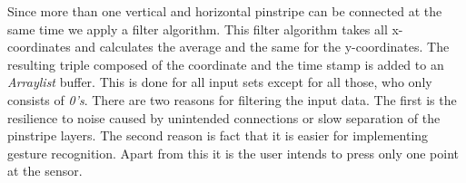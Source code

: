 Since more than one vertical and horizontal pinstripe can be connected at the same time we apply a filter algorithm. This filter algorithm takes all x-coordinates and calculates the average and the same for the y-coordinates. The resulting triple composed of the coordinate and the time stamp is added to an \emph{Arraylist} buffer. This is done for all input sets except for all those, who only consists of \emph{0's}. There are two reasons for filtering the input data. The first is the resilience to noise caused by unintended connections or slow separation of the pinstripe layers. The second reason is fact that it is easier for implementing gesture recognition. Apart from this it is the user intends to press only one point at the sensor. 
\\ \\


